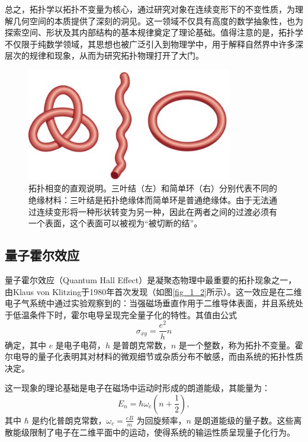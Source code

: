 总之，拓扑学以拓扑不变量为核心，通过研究对象在连续变形下的不变性质，为理解几何空间的本质提供了深刻的洞见。这一领域不仅具有高度的数学抽象性，也为探索空间、形状及其内部结构的基本规律奠定了理论基础。值得注意的是，拓扑学不仅限于纯数学领域，其思想也被广泛引入到物理学中，用于解释自然界中许多深层次的规律和现象，从而为研究拓扑物理打开了大门。
\begin{figure}[h!]
    \centering
    \includegraphics[width=0.8\textwidth]{images/fig1-1.png} 
    \caption{拓扑相变的直观说明。三叶结（左）和简单环（右）分别代表不同的绝缘材料：三叶结是拓扑绝缘体而简单环是普通绝缘体。由于无法通过连续变形将一种形状转变为另一种，因此在两者之间的过渡必须有一个表面，这个表面可以被视为“被切断的结”。\cite{d1}}
    \label{fig_1_1}
\end{figure}


\subsection{量子霍尔效应}
量子霍尔效应（Quantum Hall Effect）是凝聚态物理中最重要的拓扑现象之一，由Klaus von Klitzing于1980年首次发现\cite{d2}（如图\ref{fig_1_2}所示）。这一效应是在二维电子气系统中通过实验观察到的：当强磁场垂直作用于二维导体表面，并且系统处于低温条件下时，霍尔电导呈现完全量子化的特性。其值由公式
\begin{equation} \label{eq1-1}
    \sigma_{xy} = \frac{e^2}{h} n
\end{equation}
确定，其中 \( e \) 是电子电荷，\( h \) 是普朗克常数，\( n \) 是一个整数，称为拓扑不变量。霍尔电导的量子化表明其对材料的微观细节或杂质分布不敏感，而由系统的拓扑性质决定。

这一现象的理论基础是电子在磁场中运动时形成的朗道能级，其能量为：
\begin{equation} \label{eq1-2}
    E_n = \hbar \omega_c \left( n + \frac{1}{2} \right),
\end{equation}
其中 \( \hbar \) 是约化普朗克常数，\( \omega_c = \frac{eB}{m} \) 为回旋频率，\( n \) 是朗道能级的量子数。这些离散能级限制了电子在二维平面中的运动，使得系统的输运性质呈现量子化行为。

